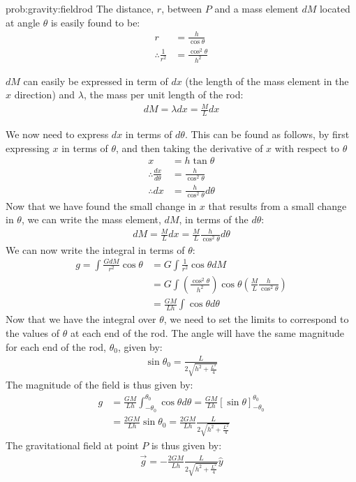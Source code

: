 \begin{solution}{prob:gravity:fieldrod}
The distance, $r$, between $P$ and a mass element $dM$ located at angle $\theta$ is easily found to be:
\begin{align*}
r &= \frac{h}{\cos\theta}\\
\therefore \frac{1}{r^2} &= \frac{\cos^2\theta}{h^2}
\end{align*}

$dM$ can easily be expressed in term of $dx$ (the length of the mass element in the $x$ direction) and $\lambda$, the mass per unit length of the rod:
\begin{align*}
dM = \lambda dx = \frac{M}{L} dx
\end{align*}

We now need to express $dx$ in terms of $d\theta$. This can be found as follows, by first expressing $x$ in terms of $\theta$, and then taking the derivative of $x$ with respect to $\theta$
\begin{align*}
x &= h\tan\theta\\
\therefore \frac{dx}{d\theta}&=\frac{h}{\cos^2\theta}\\
\therefore dx  &= \frac{h}{\cos^2\theta} d\theta
\end{align*}
Now that we have found the small change in $x$ that results from a small change in $\theta$, we can write the mass element, $dM$, in terms of the $d\theta$:
\begin{align*}
dM = \frac{M}{L} dx = \frac{M}{L}  \frac{h}{\cos^2\theta} d\theta
\end{align*}
We can now write the integral in terms of $\theta$:
\begin{align*}
g = \int \frac{GdM}{r^2}\cos\theta&=G\int \frac{1}{r^2}\cos\theta dM\\
&=G\int \left( \frac{\cos^2\theta}{h^2} \right)\cos\theta \left(\frac{M}{L}  \frac{h}{\cos^2\theta}  \right)\\
&=\frac{GM}{Lh}\int\cos\theta d\theta
\end{align*}
Now that we have the integral over $\theta$, we need to set the limits to correspond to the values of $\theta$ at each end of the rod. The angle will have the same magnitude for each end of the rod, $\theta _0$, given by:
\begin{align*}
\sin\theta_0 =\frac{L}{2\sqrt{h^2 + \frac{L^2}{4}}}
\end{align*}
The magnitude of the field is thus given by:
\begin{align*}
g &=\frac{GM}{Lh}\int_{-\theta_0}^{\theta_0}\cos\theta d\theta = \frac{GM}{Lh} [\sin\theta]_{-\theta_0}^{\theta_0}\\
&=\frac{2GM}{Lh} \sin\theta_0  = \frac{2GM}{Lh} \frac{L}{2\sqrt{h^2 + \frac{L^2}{4}}}
\end{align*}
The gravitational field at point $P$ is thus given by:
\begin{align*}
\vec g =  -\frac{2GM}{Lh} \frac{L}{2\sqrt{h^2 + \frac{L^2}{4}}}\hat y
\end{align*}
\end{solution}



